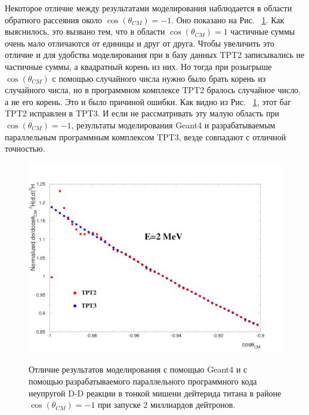 \documentclass[a4paper,12pt]{article}
\begin{document}
\begin{large}
	Некоторое отличие между результатами моделирования наблюдается в области обратного рассеяния около    $\cos{ \left( \theta_{CM} \right) }=-1$. Оно показано на Рис. ~\ref{fig:CompareTPT2WithTPT32billionParticles}. Как выяснилось, это вызвано тем, что в области $\cos{ \left( \theta_{CM} \right) }=1$ частичные суммы очень мало отличаются от единицы и друг от друга. Чтобы увеличить это отличие и для удобства моделирования при в базу данных TPT2 записывались не частичные суммы, а квадратный корень из них. Но тогда при розыгрыше $\cos{ \left( \theta_{CM} \right) }$ с помощью случайного числа нужно было брать корень из случайного числа, но в программном комплексе TPT2 бралось случайное число, а не его корень. Это и было причиной ошибки. Как видно из Рис. ~\ref{fig:CompareTPT2WithTPT32billionParticles}, этот баг TPT2 исправлен в TPT3. И если не рассматривать эту малую область при $\cos{ \left( \theta_{CM} \right) }=-1$, результаты моделирования Geant4 и разрабатываемым параллельным программным комплексом TPT3, везде совпадают с отличной точностью.
	
\begin{figure}[ht]
  {
     \includegraphics[width=0.99\linewidth]{images/compare_tpt2_with_tpt3_2billion.pdf}
  }
  \caption{Отличие результатов моделирования с помощью Geant4 и с помощью разрабатываемого параллельного программного кода неупругой D-D реакции в тонкой мишени дейтерида титана в районе $\cos{ \left( \theta_{CM} \right) }=-1$ при запуске 2 миллиардов дейтронов.}
  \label{fig:CompareTPT2WithTPT32billionParticles}
\end{figure}	
	

\clearpage{}

\end{large}
\end{document}
